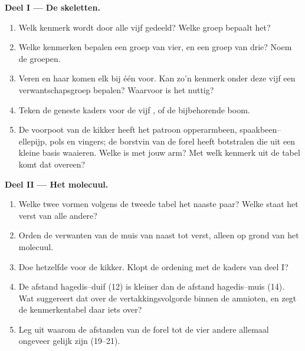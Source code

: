 \begin{problem}
\medskip
\noindent\textbf{Deel I --- De skeletten.}
\begin{enumerate}
  \item Welk kenmerk wordt door alle vijf gedeeld? Welke groep bepaalt
        het?
  \item Welke kenmerken bepalen een groep van vier, en een groep van
        drie? Noem de groepen.
  \item Veren en haar komen elk bij één  voor. Kan zo'n kenmerk
        onder deze vijf een verwantschapsgroep bepalen? Waarvoor is het
        nuttig?
  \item Teken de geneste kaders voor de vijf , of de bijbehorende
        boom.
  \item De voorpoot van de kikker heeft het patroon opperarmbeen,
        spaakbeen--ellepijp, pols en vingers; de borstvin van de forel
        heeft botstralen die uit een kleine basis waaieren. Welke is
         met jouw arm? Met welk kenmerk uit de tabel komt dat
        overeen?
\end{enumerate}

\medskip
\noindent\textbf{Deel II --- Het molecuul.}
\begin{enumerate}[resume]
  \item Welke twee  vormen volgens de tweede tabel het naaste
        paar? Welke  staat het verst van alle andere?
  \item Orden de verwanten van de muis van naast tot verst, alleen op
        grond van het molecuul.
  \item Doe hetzelfde voor de kikker. Klopt de ordening met de kaders
        van deel I?
  \item De afstand hagedis--duif (12) is kleiner dan de afstand
        hagedis--muis (14). Wat suggereert dat over de vertakkingsvolgorde
        binnen de amnioten, en zegt de kenmerkentabel daar iets over?
  \item Leg uit waarom de afstanden van de forel tot de vier andere
        allemaal ongeveer gelijk zijn (19--21).
\end{enumerate}


\end{problem}
